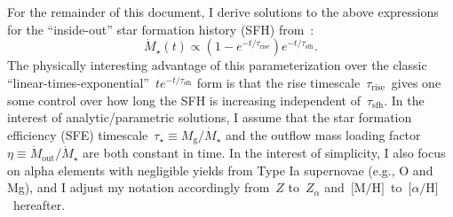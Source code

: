 \documentclass[12pt]{article}
\newcommand{\ah}{\ensuremath{\text{[$\alpha$/H]}}}
\newcommand{\mh}{\ensuremath{\text{[M/H]}}}
\newcommand{\timescale}[1]{\ensuremath{\tau_\text{#1}}}
\begin{document}
\par
For the remainder of this document, I derive solutions to the above expressions
for the ``inside-out'' star formation history (SFH) from~\citet{Johnson2021}:
\begin{equation}
\dot{M}_\star(t) \propto \left(1 - e^{-t / \timescale{rise}}\right)
e^{-t / \timescale{sfh}}.
\label{eq:insideout_sfh}
\end{equation}
The physically interesting advantage of this parameterization over the classic
``linear-times-exponential''~$t e^{-t / \timescale{sfh}}$ form is that the
rise timescale~\timescale{rise}~gives one some control over how long the SFH is
increasing independent of~\timescale{sfh}.
In the interest of analytic/parametric solutions, I assume that the star
formation efficiency (SFE) timescale~$\tau_\star \equiv M_\text{g} /
\dot{M}_\star$ and the outflow mass loading factor~$\eta \equiv
\dot{M}_\text{out} / \dot{M}_\star$ are both constant in time.
In the interest of simplicity, I also focus on alpha elements with negligible
yields from Type Ia supernovae (e.g., O and Mg), and I adjust my notation
accordingly from~$Z$ to~$Z_\alpha$ and~\mh~to~\ah~hereafter.
\end{document}
